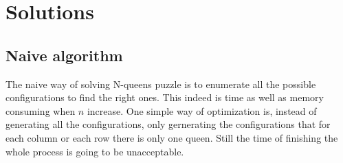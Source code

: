 \begin{table}[]
  \centering
  \caption{Number of solutions of N-queens puzzle.}
  \label{tab:numberOfSolutions}
\end{table}

\section{Solutions}
\subsection{Naive algorithm}
The naive way of solving N-queens puzzle is to enumerate all the possible configurations to find the right ones. This indeed is time as well as memory consuming when $n$ increase. One simple way of optimization is, instead of generating all the configurations, only gernerating the configurations that for each column or each row there is only one queen. Still the time of finishing the whole process is going to be unacceptable.

